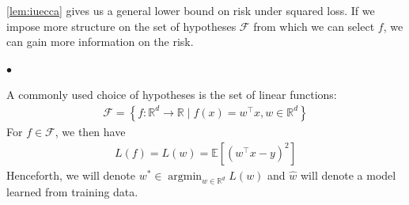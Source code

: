 \documentclass{article}
\begin{document}
\cref{lem:iuecca} gives us a general lower bound on risk under squared loss. If we impose more structure on the set of hypotheses $\mathcal{F}$ from which we can select $f$, we can gain more information on the risk.

$\bullet$ 

A commonly used choice of hypotheses is the set of linear functions:
\begin{align*}
\mathcal{F}=\left\{f: \mathbb{R}^{d} \rightarrow \mathbb{R} \mid f(x)=w^{\top} x, w \in \mathbb{R}^{d}\right\}
\end{align*}
For $f \in \mathcal{F}$, we then have
\begin{align*}
L(f)=L(w)=\mathbb{E}\left[\left(w^{\top} x-y\right)^{2}\right]
\end{align*}
Henceforth, we will denote $w^{*} \in \operatorname{argmin}_{w \in \mathbb{R}^{d}} L(w)$ and $\hat{w}$ will denote a model learned from training data.
\end{document}
